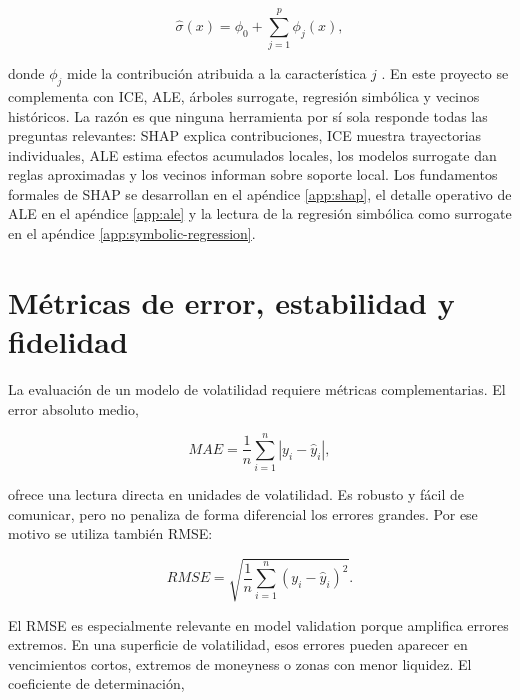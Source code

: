 \begin{equation}
\hat{\sigma}(x)=\phi_0+\sum_{j=1}^{p}\phi_j(x),
\label{eq:shap-additive_}
\end{equation}

donde \(\phi_j\) mide la contribución atribuida a la característica \(j\) \citep{lundberg2017unified}. En este proyecto se complementa con ICE, ALE, árboles surrogate, regresión simbólica y vecinos históricos. La razón es que ninguna herramienta por sí sola responde todas las preguntas relevantes: SHAP explica contribuciones, ICE muestra trayectorias individuales, ALE estima efectos acumulados locales, los modelos surrogate dan reglas aproximadas y los vecinos informan sobre soporte local. Los fundamentos formales de SHAP se desarrollan en el apéndice \ref{app:shap}, el detalle operativo de ALE en el apéndice \ref{app:ale} y la lectura de la regresión simbólica como surrogate en el apéndice \ref{app:symbolic-regression}.


\section{Métricas de error, estabilidad y fidelidad}
\label{sec:metricas-teoria}

La evaluación de un modelo de volatilidad requiere métricas complementarias. El error absoluto medio,

\begin{equation}
MAE = \frac{1}{n}\sum_{i=1}^{n}|y_i-\hat{y}_i|,
\label{eq:mae}
\end{equation}

ofrece una lectura directa en unidades de volatilidad. Es robusto y fácil de comunicar, pero no penaliza de forma diferencial los errores grandes. Por ese motivo se utiliza también RMSE:

\begin{equation}
RMSE = \sqrt{\frac{1}{n}\sum_{i=1}^{n}(y_i-\hat{y}_i)^2}.
\label{eq:rmse}
\end{equation}

El RMSE es especialmente relevante en model validation porque amplifica errores extremos. En una superficie de volatilidad, esos errores pueden aparecer en vencimientos cortos, extremos de moneyness o zonas con menor liquidez. El coeficiente de determinación,

